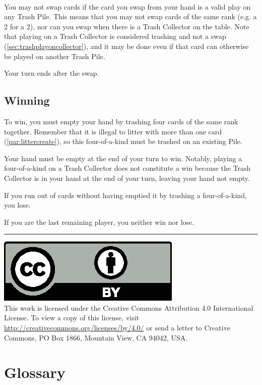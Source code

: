 \documentclass{article}
\newcommand\copyrightfooter{
  \medskip
  \hrule

  {
    \small
    \includegraphics[scale=0.5]{cc-by.eps}\\
    This work is licensed under the Creative Commons Attribution 4.0
    International License. To view a copy of this license, visit
    \url{http://creativecommons.org/licenses/by/4.0/} or send a letter to Creative Commons, PO Box 1866, Mountain View, CA 94042, USA.
  }
}
\begin{document}
\paragraph{} \label{par:swaprestriction}
You may not swap cards if the card you swap from your hand is a valid play on any Trash Pile. This means that you may not swap cards of the same rank (e.g. a 2 for a 2), nor can you swap when there is a Trash Collector on the table. Note that playing on a Trash Collector is considered trashing and not a swap (\autoref{sec:trashplayoncollector}), and it may be done even if that card can otherwise be played on another Trash Pile.

Your turn ends after the swap.

\subsection{Winning}
\label{sec:winning}

To win, you must empty your hand by trashing four cards of the same rank together. Remember that it is illegal to litter with more than one card (\autoref{par:littercreate}), so this four-of-a-kind must be trashed on an existing Pile.

Your hand must be empty at the end of your turn to win. Notably, playing a four-of-a-kind on a Trash Collector does not constitute a win because the Trash Collector is in your hand at the end of your turn, leaving your hand not empty.

If you run out of cards without having emptied it by trashing a four-of-a-kind, you lose.

If you are the last remaining player, you neither win nor lose.

\copyrightfooter

\newpage
\appendix
\section{Glossary}
\label{sec:glossary}
\end{document}
